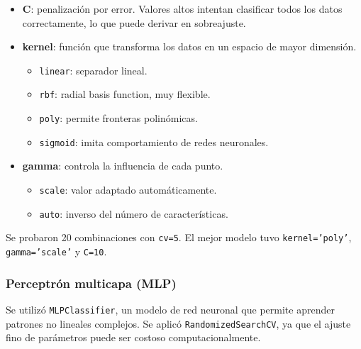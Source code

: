 \begin{itemize}
    \item \textbf{C}: penalización por error. Valores altos intentan clasificar todos los datos correctamente, lo que puede derivar en sobreajuste.
    \item \textbf{kernel}: función que transforma los datos en un espacio de mayor dimensión.
    \begin{itemize}
        \item \texttt{linear}: separador lineal.
        \item \texttt{rbf}: radial basis function, muy flexible.
        \item \texttt{poly}: permite fronteras polinómicas.
        \item \texttt{sigmoid}: imita comportamiento de redes neuronales.
    \end{itemize}
    \item \textbf{gamma}: controla la influencia de cada punto. 
    \begin{itemize}
        \item \texttt{scale}: valor adaptado automáticamente.
        \item \texttt{auto}: inverso del número de características.
    \end{itemize}
\end{itemize}

Se probaron 20 combinaciones con \texttt{cv=5}. El mejor modelo tuvo \texttt{kernel='poly'}, \texttt{gamma='scale'} y \texttt{C=10}.

\subsubsection{Perceptrón multicapa (MLP)}

Se utilizó \texttt{MLPClassifier}, un modelo de red neuronal que permite aprender patrones no lineales complejos. Se aplicó \texttt{RandomizedSearchCV}, ya que el ajuste fino de parámetros puede ser costoso computacionalmente.


